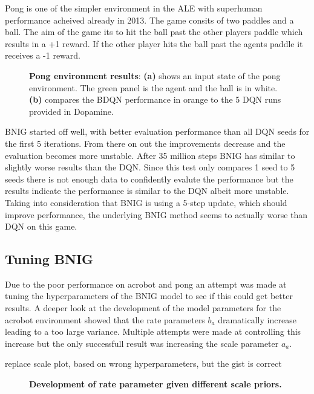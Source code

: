 Pong is one of the simpler environment in the ALE with superhuman performance acheived already in 2013\citep{mnih_2013}. The game consits of two paddles and a ball. The aim of the game its to hit the ball past the other players paddle which results in a +1 reward. If the other player hits the ball past the agents paddle it receives a -1 reward. 

\begin{figure}[H]
    \caption{\textbf{Pong environment results}: \textbf{(a)} shows an input state of the pong environment\citep{gym_docs}. The green panel is the agent and the ball is in white. \textbf{(b)} compares the BDQN performance in orange to the 5 DQN runs provided in Dopamine.}
    \label{fig:nn_pong}
\end{figure}

BNIG started off well, with better evaluation performance than all DQN seeds for the first 5 iterations. From there on out the improvements decrease and the evaluation becomes more unstable. After 35 million steps BNIG has similar to slightly worse results than the DQN. Since this test only compares 1 seed to 5 seeds there is not enough data to confidently evalute the performance but the results indicate the performance is similar to the DQN albeit more unstable. Taking into consideration that BNIG is using a 5-step update, which should improve performance, the underlying BNIG method seems to actually worse than DQN on this game.

\subsection{Tuning BNIG}

Due to the poor performance on acrobot and pong an attempt was made at tuning the hyperparameters of the BNIG model to see if this could get better results. A deeper look at the development of the model parameters for the acrobot environment showed that the rate parameters $b_a$ dramatically increase leading to a too large variance. Multiple attempts were made at controlling this increase but the only successfull result was increasing the scale parameter $a_a$.


\todo replace scale plot, based on wrong hyperparameters, but the gist is correct
\begin{figure}[H]
    \centering
    \caption{\textbf{Development of rate parameter given different scale priors.}}
    \label{fig:scale_stability}
\end{figure}

